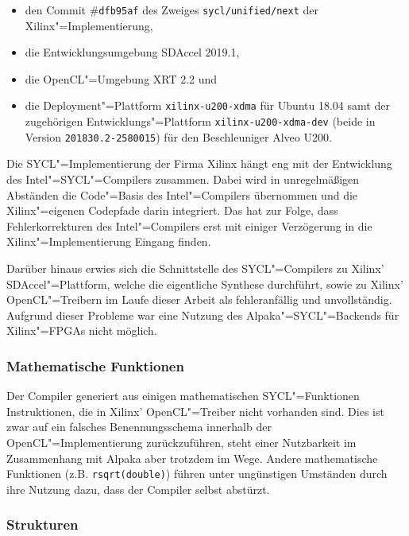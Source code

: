 \begin{itemize}
    \item den Commit \#\texttt{dfb95af} des Zweiges \texttt{sycl/unified/next}
          der Xilinx"=Implementierung,
    \item die Entwicklungsumgebung SDAccel 2019.1,
    \item die OpenCL"=Umgebung XRT 2.2 und
    \item die Deployment"=Plattform \texttt{xilinx-u200-xdma} für Ubuntu 18.04
          samt der zugehörigen Entwicklungs"=Plattform
          \texttt{xilinx-u200-xdma-dev} (beide in Version
          \texttt{201830.2-2580015}) für den Beschleuniger Alveo U200.
\end{itemize}

Die SYCL"=Implementierung der Firma Xilinx hängt eng mit der Entwicklung des
Intel"=SYCL"=Compilers zusammen. Dabei wird in unregelmäßigen Abständen die
Code"=Basis des Intel"=Compilers übernommen und die Xilinx"=eigenen Codepfade
darin integriert. Das hat zur Folge, dass Fehlerkorrekturen des Intel"=Compilers
erst mit einiger Verzögerung in die Xilinx"=Implementierung Eingang finden.

Darüber hinaus erwies sich die Schnittstelle des SYCL"=Compilers zu Xilinx'
SDAccel"=Plattform, welche die eigentliche Synthese durchführt, sowie zu Xilinx'
OpenCL"=Treibern im Laufe dieser Arbeit als fehleranfällig und unvollständig.
Aufgrund dieser Probleme war eine Nutzung des Alpaka"=SYCL"=Backends für
Xilinx"=FPGAs nicht möglich.

\subsubsection{Mathematische Funktionen}

Der Compiler generiert aus einigen mathematischen SYCL"=Funktionen
Instruktionen, die in Xilinx' OpenCL"=Treiber nicht vorhanden sind. Dies ist
zwar auf ein falsches Benennungsschema innerhalb der OpenCL"=Implementierung
zurückzuführen, steht einer Nutzbarkeit im Zusammenhang mit Alpaka aber trotzdem
im Wege. Andere mathematische Funktionen (z.B. \texttt{rsqrt(double)}) führen
unter ungünstigen Umständen durch ihre Nutzung dazu, dass der Compiler selbst
abstürzt.  

\subsubsection{Strukturen}

